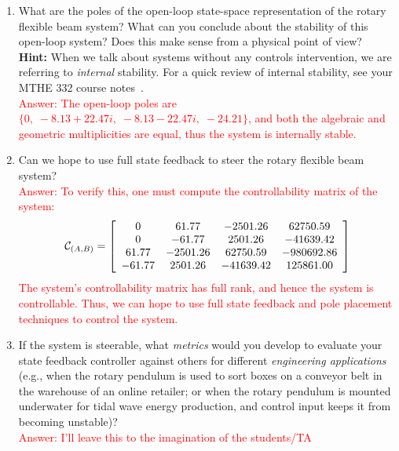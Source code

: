 \documentclass[12pt]{report}
\newcommand\drew[1]{\textcolor{red}{#1}}
\begin{document}
\begin{enumerate}
    \item What are the poles of the open-loop state-space representation of the rotary flexible beam system? What can you conclude about the stability of this open-loop system? Does this make sense from a physical point of view?\\
          \textbf{Hint:} When we talk about systems without any controls intervention, we are referring to \emph{internal} stability. For a quick review of internal stability, see your MTHE 332 course notes~\cite[p. 162]{AL:04}.\\
          \drew{Answer: The open-loop poles are $\{0,\; -8.13+22.47i,\; -8.13-22.47i,\; -24.21\}$, and both the algebraic and geometric multiplicities are equal, thus the system is internally stable.}
    \item Can we hope to use full state feedback to steer the rotary flexible beam system?\\
          \drew{Answer: To verify this, one must compute the controllability matrix of the system:
              \[
                  \mathcal{C}_{(A,B)} = \left[\begin{array}{c c c c}
                          0      & 61.77    & -2501.26  & 62750.59   \\
                          0      & -61.77   & 2501.26   & -41639.42  \\
                          61.77  & -2501.26 & 62750.59  & -980692.86 \\
                          -61.77 & 2501.26  & -41639.42 & 125861.00
                      \end{array}\right]
              \]
              The system's controllability matrix has full rank, and hence the system is controllable. Thus, we can hope to use full state feedback and pole placement techniques to control the system.}
    \item If the system is steerable, what \emph{metrics} would you develop to evaluate your state feedback controller against others for different \emph{engineering applications} (e.g., when the rotary pendulum is used to sort boxes on a conveyor belt in the warehouse of an online retailer; or when the rotary pendulum is mounted underwater for tidal wave energy production, and control input keeps it from becoming unstable)?\\
          \drew{Answer: I'll leave this to the imagination of the students/TA}
\end{enumerate}
\end{document}
